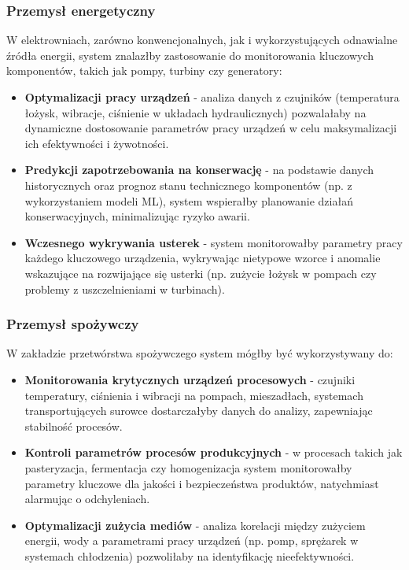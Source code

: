 \subsubsection{Przemysł energetyczny}
\label{subsubsec:przemysl_energetyczny}

W elektrowniach, zarówno konwencjonalnych, jak i wykorzystujących odnawialne źródła energii, system znalazłby zastosowanie do monitorowania kluczowych komponentów, takich jak pompy, turbiny czy generatory:

\begin{itemize}
    \item \textbf{Optymalizacji pracy urządzeń} - analiza danych z czujników (temperatura łożysk, wibracje, ciśnienie w układach hydraulicznych) pozwalałaby na dynamiczne dostosowanie
    parametrów pracy urządzeń w celu maksymalizacji ich efektywności i żywotności.
    \item \textbf{Predykcji zapotrzebowania na konserwację} - na podstawie danych historycznych oraz prognoz stanu technicznego komponentów (np. z wykorzystaniem modeli ML), system wspierałby
    planowanie działań konserwacyjnych, minimalizując ryzyko awarii.
    \item \textbf{Wczesnego wykrywania usterek} - system monitorowałby parametry pracy każdego kluczowego urządzenia, wykrywając nietypowe wzorce i anomalie 
    wskazujące na rozwijające się usterki (np. zużycie łożysk w pompach czy problemy z uszczelnieniami w turbinach).
\end{itemize}

\subsubsection{Przemysł spożywczy}
\label{subsubsec:przemysl_spozywczy}

W zakładzie przetwórstwa spożywczego system mógłby być wykorzystywany do:

\begin{itemize}
    \item \textbf{Monitorowania krytycznych urządzeń procesowych} - czujniki temperatury, ciśnienia i wibracji na pompach, mieszadłach, systemach transportujących surowce dostarczałyby danych do analizy, zapewniając stabilność procesów.
    \item \textbf{Kontroli parametrów procesów produkcyjnych} - w procesach takich jak pasteryzacja, fermentacja czy homogenizacja system monitorowałby parametry kluczowe dla jakości i bezpieczeństwa produktów, natychmiast alarmując o odchyleniach.
    \item \textbf{Optymalizacji zużycia mediów} - analiza korelacji między zużyciem energii, wody a parametrami pracy urządzeń (np. pomp, sprężarek w systemach chłodzenia) pozwoliłaby na identyfikację nieefektywności.
\end{itemize}

